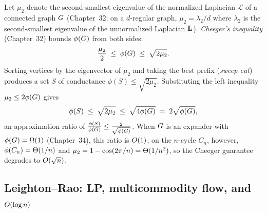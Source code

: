 Let $\mu_2$ denote the second-smallest eigenvalue of the normalized Laplacian $\mathcal{L}$ of a connected
graph $G$ (Chapter~32; on a $d$-regular graph, $\mu_2 = \lambda_2/d$ where $\lambda_2$ is the second-smallest
eigenvalue of the unnormalized Laplacian $\mathbf{L}$). \emph{Cheeger's inequality} (Chapter~32) bounds $\phi(G)$
from both sides:
\[
  \frac{\mu_2}{2} \;\le\; \phi(G) \;\le\; \sqrt{2\mu_2}.
\]
Sorting vertices by the eigenvector of $\mu_2$ and taking the best prefix (\emph{sweep cut}) produces a set
$S$ of conductance $\phi(S) \le \sqrt{2\mu_2}$. Substituting the left inequality $\mu_2 \le 2\phi(G)$ gives
\[
  \phi(S) \;\le\; \sqrt{2\mu_2} \;\le\; \sqrt{4\phi(G)} \;=\; 2\sqrt{\phi(G)},
\]
an approximation ratio of $\tfrac{\phi(S)}{\phi(G)} \le \tfrac{2}{\sqrt{\phi(G)}}$. When $G$ is an
expander with $\phi(G)=\Omega(1)$ (Chapter~34), this ratio is $O(1)$; on the $n$-cycle $C_n$, however,
$\phi(C_n)=\Theta(1/n)$ and $\mu_2 = 1-\cos(2\pi/n) = \Theta(1/n^2)$, so the Cheeger guarantee degrades to $O(\sqrt{n})$.

\subsection{Leighton--Rao: LP, multicommodity flow, and $O(\log n)$}

